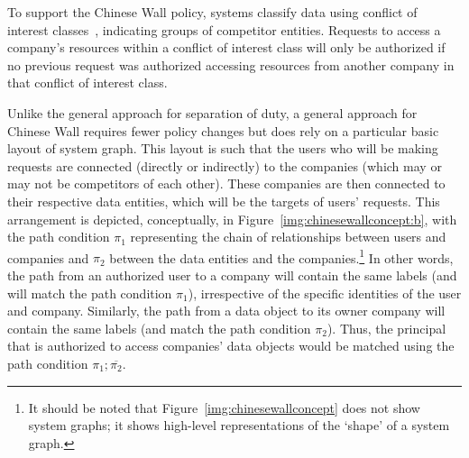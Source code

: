 \documentclass{article}
\newcommand{\comp}{\mathbin{;}}
\begin{document}
To support the Chinese Wall policy, systems classify data using conflict of interest classes~\cite{BrewerN89}, indicating groups of competitor entities.
Requests to access a company's resources within a conflict of interest class will only be authorized if no previous request was authorized accessing resources from another company in that conflict of interest class.

Unlike the general approach for separation of duty, a general approach for Chinese Wall requires fewer policy changes but does rely on a particular basic layout of system graph.
This layout is such that the users who will be making requests are connected (directly or indirectly) to the companies (which may or may not be competitors of each other).
These companies are then connected to their respective data entities, which will be the targets of users' requests.
This arrangement is depicted, conceptually, in Figure~\ref{img:chinesewallconcept:b}, with the path condition $\pi_1$ representing the chain of relationships between users and companies and $\pi_2$ between the data entities and the companies.\footnote{It should be noted that Figure~\ref{img:chinesewallconcept} does not show system graphs; it shows high-level representations of the `shape' of a system graph.}
In other words, the path from an authorized user to a company will contain the same labels (and will match the path condition $\pi_1$), irrespective of the specific identities of the user and company.
Similarly, the path from a data object to its owner company will contain the same labels (and match the path condition $\pi_2$).
Thus, the principal that is authorized to access companies' data objects would be matched using the path condition $\pi_1 \comp \overline{\pi_2}$.
\end{document}
